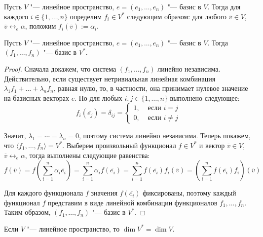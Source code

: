     \begin{definition}
    	Пусть $V$ "--- линейное пространство, $e = (e_1, \dots, e_n)$ "--- базис в $V$. Тогда для каждого $i \in \{1, \dots, n\}$ определим $f_i \in V^*$ следующим образом: для любого $\overline{v} \in V$, $\overline{v} \leftrightarrow_{e} \alpha$, положим $f_i(\overline{v}) := \alpha_i$.
    \end{definition}
    
    \begin{proposition}
    	Пусть $V$ "--- линейное пространство, $e = (e_1, \dots, e_n)$ "--- базис в $V$. Тогда $(f_1, \dots, f_n)$ "--- базис в $V^*$.
    \end{proposition}
    
    \begin{proof}
    	Сначала докажем, что система $(f_1, \dots, f_n)$ линейно независима. Действительно, если существует нетривиальная линейная комбинация $\lambda_1f_1 + \dots + \lambda_nf_n$, равная нулю, то, в частности, она принимает нулевое значение на базисных векторах $e$. Но для любых $i, j \in \{1, \dotsc, n\}$ выполнено следующее:
    	\[f_i(\overline{e_j}) = \delta_{ij} = \begin{cases}
    		1,&\text{ если }i = j
    		\\
    		0,&\text{ если }i \ne j
    	\end{cases}\]
    	
    	Значит, $\lambda_1 = \dotsb = \lambda_n = 0$, поэтому система линейно независима. Теперь покажем, что $\langle f_1, \dots, f_n\rangle = V^*$. Выберем произвольный функционал $f \in V^*$ и вектор $\overline{v} \in V$, $\overline{v} \leftrightarrow_{e} \alpha$, тогда выполнены следующие равенства:
    	\[f(\overline{v}) = f\left(\sum_{i = 1}^n\alpha_i\overline{e_i}\right) = \sum_{i = 1}^n\alpha_if(\overline{e_i}) =  \sum_{i = 1}^nf(\overline{e_i})f_i(\overline{v}) = \left(\sum_{i = 1}^nf(\overline{e_i})f_i\right)(\overline{v})\]
    	
    	Для каждого функционала $f$ значения $f(\overline{e_i})$ фиксированы, поэтому каждый функционал $f$ представим в виде линейной комбинации функционалов $f_1, \dotsc, f_n$. Таким образом, $(f_1, \dots, f_n)$ "--- базис в $V^*$.
    \end{proof}
    
    \begin{corollary}
    	Если $V$ "--- линейное пространство, то $\dim{V^*} = \dim{V}$.
    \end{corollary}
    
